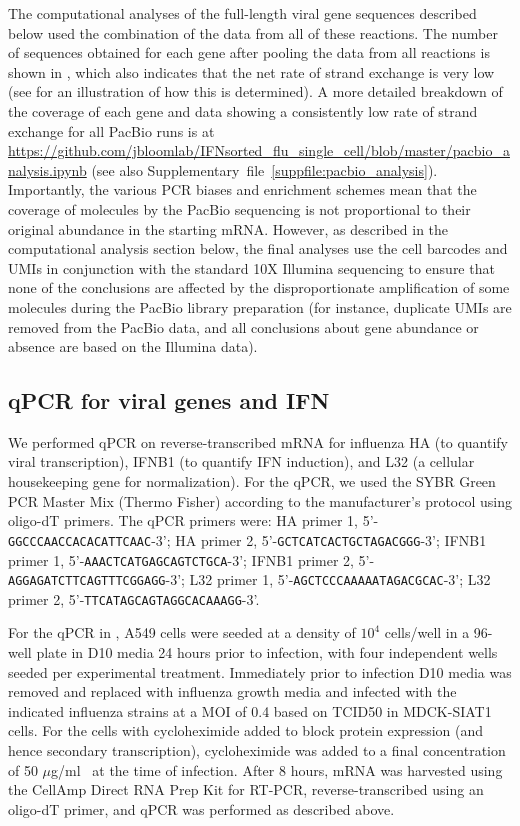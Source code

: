 \documentclass[9pt,lineno]{elife}
\begin{document}
The computational analyses of the full-length viral gene sequences described below used the combination of the data from all of these reactions.
The number of sequences obtained for each gene after pooling the data from all reactions is shown in , which also indicates that the net rate of strand exchange is very low (see  for an illustration of how this is determined).
A more detailed breakdown of the coverage of each gene and data showing a consistently low rate of strand exchange for all PacBio runs is at \url{https://github.com/jbloomlab/IFNsorted_flu_single_cell/blob/master/pacbio_analysis.ipynb} (see also Supplementary~file~\ref{suppfile:pacbio_analysis}).
Importantly, the various PCR biases and enrichment schemes mean that the coverage of molecules by the PacBio sequencing is not proportional to their original abundance in the starting mRNA.
However, as described in the computational analysis section below, the final analyses use the cell barcodes and UMIs in conjunction with the standard 10X Illumina sequencing to ensure that none of the conclusions are affected by the disproportionate amplification of some molecules during the PacBio library preparation (for instance, duplicate UMIs are removed from the PacBio data, and all conclusions about gene abundance or absence are based on the Illumina data).

\subsection{qPCR for viral genes and IFN}
We performed qPCR on reverse-transcribed mRNA for influenza HA (to quantify viral transcription), IFNB1 (to quantify IFN induction), and L32 (a cellular housekeeping gene for normalization).
For the qPCR, we used the SYBR Green PCR Master Mix (Thermo Fisher) according to the manufacturer's protocol using oligo-dT primers.
The qPCR primers were: HA primer 1, 5'-\texttt{GGCCCAACCACACATTCAAC}-3'; HA primer 2, 5'-\texttt{GCTCATCACTGCTAGACGGG}-3'; IFNB1 primer 1, 5'-\texttt{AAACTCATGAGCAGTCTGCA}-3'; IFNB1 primer 2, 5'-\texttt{AGGAGATCTTCAGTTTCGGAGG}-3'; L32 primer 1, 5'-\texttt{AGCTCCCAAAAATAGACGCAC}-3'; L32 primer 2, 5'-\texttt{TTCATAGCAGTAGGCACAAAGG}-3'. 

For the qPCR in , A549 cells were seeded at a density of $10^4$ cells/well in a 96-well plate in D10 media 24 hours prior to infection, with four independent wells seeded per experimental treatment. 
Immediately prior to infection D10 media was removed and replaced with influenza growth media and infected with the indicated influenza strains at a MOI of 0.4 based on TCID50 in MDCK-SIAT1 cells.
For the cells with cycloheximide added to block protein expression (and hence secondary transcription), cycloheximide was added to a final concentration of 50 $\mu$g/ml~\citep[a concentration sufficient to block secondary transcription;][]{killip2014activation} at the time of infection.
After 8 hours, mRNA was harvested using the CellAmp Direct RNA Prep Kit for RT-PCR, reverse-transcribed using an oligo-dT primer, and qPCR was performed as described above.
\end{document}
